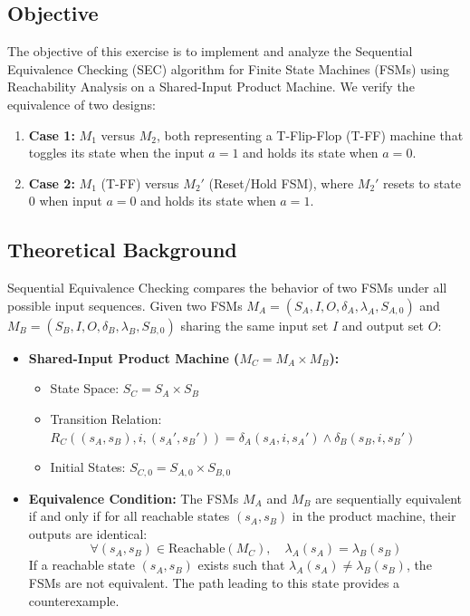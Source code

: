 \documentclass[12pt,a4paper]{article}
\begin{document}
\subsection{Objective}
The objective of this exercise is to implement and analyze the Sequential Equivalence Checking (SEC) algorithm for Finite State Machines (FSMs) using Reachability Analysis on a Shared-Input Product Machine. We verify the equivalence of two designs:
\begin{enumerate}
    \item \textbf{Case 1:} $M_1$ versus $M_2$, both representing a T-Flip-Flop (T-FF) machine that toggles its state when the input $a = 1$ and holds its state when $a = 0$.
    \item \textbf{Case 2:} $M_1$ (T-FF) versus $M_2'$ (Reset/Hold FSM), where $M_2'$ resets to state $0$ when input $a = 0$ and holds its state when $a = 1$.
\end{enumerate}

\subsection{Theoretical Background}
Sequential Equivalence Checking compares the behavior of two FSMs under all possible input sequences.
Given two FSMs $M_A = (S_A, I, O, \delta_A, \lambda_A, S_{A,0})$ and $M_B = (S_B, I, O, \delta_B, \lambda_B, S_{B,0})$ sharing the same input set $I$ and output set $O$:

\begin{itemize}
    \item \textbf{Shared-Input Product Machine ($M_C = M_A \times M_B$):}
    \begin{itemize}
        \item State Space: $S_C = S_A \times S_B$
        \item Transition Relation: $R_C((s_A, s_B), i, (s_A', s_B')) = \delta_A(s_A, i, s_A') \land \delta_B(s_B, i, s_B')$
        \item Initial States: $S_{C,0} = S_{A,0} \times S_{B,0}$
    \end{itemize}
    \item \textbf{Equivalence Condition:}
    The FSMs $M_A$ and $M_B$ are sequentially equivalent if and only if for all reachable states $(s_A, s_B)$ in the product machine, their outputs are identical:
    \[ \forall (s_A, s_B) \in \text{Reachable}(M_C), \quad \lambda_A(s_A) = \lambda_B(s_B) \]
    If a reachable state $(s_A, s_B)$ exists such that $\lambda_A(s_A) \neq \lambda_B(s_B)$, the FSMs are not equivalent. The path leading to this state provides a counterexample.
\end{itemize}
\end{document}
